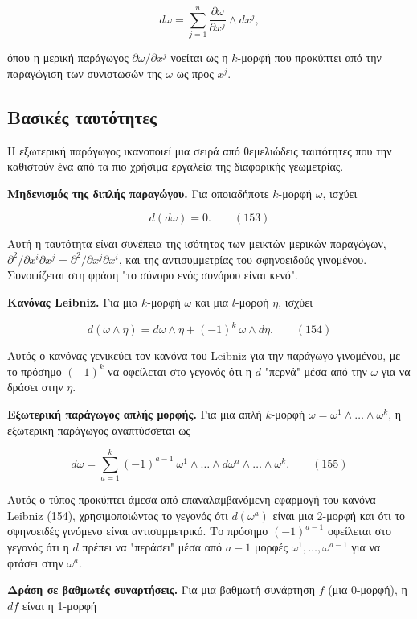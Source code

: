 \documentclass[12pt]{article}
\begin{document}
\[
d\omega = \sum_{j=1}^{n} \frac{\partial \omega}{\partial x^j} \wedge dx^j,
\]

όπου η μερική παράγωγος $\partial \omega / \partial x^j$ νοείται ως η $k$-μορφή που προκύπτει από την παραγώγιση των συνιστωσών της $\omega$ ως προς $x^j$.

\subsection{Βασικές ταυτότητες}

Η εξωτερική παράγωγος ικανοποιεί μια σειρά από θεμελιώδεις ταυτότητες που την καθιστούν ένα από τα πιο χρήσιμα εργαλεία της διαφορικής γεωμετρίας.

\textbf{Μηδενισμός της διπλής παραγώγου.} Για οποιαδήποτε $k$-μορφή $\omega$, ισχύει

\[
d(d\omega) = 0. \qquad (153)
\]

Αυτή η ταυτότητα είναι συνέπεια της ισότητας των μεικτών μερικών παραγώγων, $\partial^2 / \partial x^i \partial x^j = \partial^2 / \partial x^j \partial x^i$, και της αντισυμμετρίας του σφηνοειδούς γινομένου. Συνοψίζεται στη φράση "το σύνορο ενός συνόρου είναι κενό".

\textbf{Κανόνας Leibniz.} Για μια $k$-μορφή $\omega$ και μια $l$-μορφή $\eta$, ισχύει

\[
d(\omega \wedge \eta) = d\omega \wedge \eta + (-1)^k \ \omega \wedge d\eta. \qquad (154)
\]

Αυτός ο κανόνας γενικεύει τον κανόνα του Leibniz για την παράγωγο γινομένου, με το πρόσημο $(-1)^k$ να οφείλεται στο γεγονός ότι η $d$ "περνά" μέσα από την $\omega$ για να δράσει στην $\eta$.

\textbf{Εξωτερική παράγωγος απλής μορφής.} Για μια απλή $k$-μορφή $\omega = \omega^1 \wedge \dots \wedge \omega^k$, η εξωτερική παράγωγος αναπτύσσεται ως

\[
d\omega = \sum_{a=1}^{k} (-1)^{a-1} \ \omega^1 \wedge \dots \wedge d\omega^a \wedge \dots \wedge \omega^k. \qquad (155)
\]

Αυτός ο τύπος προκύπτει άμεσα από επαναλαμβανόμενη εφαρμογή του κανόνα Leibniz (154), χρησιμοποιώντας το γεγονός ότι $d(\omega^a)$ είναι μια 2-μορφή και ότι το σφηνοειδές γινόμενο είναι αντισυμμετρικό. Το πρόσημο $(-1)^{a-1}$ οφείλεται στο γεγονός ότι η $d$ πρέπει να "περάσει" μέσα από $a-1$ μορφές $\omega^1, \dots, \omega^{a-1}$ για να φτάσει στην $\omega^a$.

\textbf{Δράση σε βαθμωτές συναρτήσεις.} Για μια βαθμωτή συνάρτηση $f$ (μια $0$-μορφή), η $df$ είναι η 1-μορφή
\end{document}
